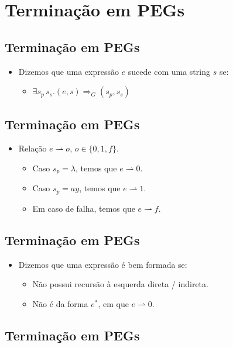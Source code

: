 \documentclass[11pt]{article}
\begin{document}
\section*{Terminação em PEGs}
\label{sec:org8e23bdd}

\subsection*{Terminação em PEGs}
\label{sec:orgc4a3a71}

\begin{itemize}
\item Dizemos que uma expressão \(e\) sucede com uma string \(s\) se:
\begin{itemize}
\item \(\exists s_p\,s_s . (e,s)\Rightarrow_{G} (s_p,s_s)\)
\end{itemize}
\end{itemize}
\subsection*{Terminação em PEGs}
\label{sec:org7a22b09}

\begin{itemize}
\item Relação \(e \rightharpoonup o\), \(o\in\{0,1,f\}\).
\begin{itemize}
\item Caso \(s_p = \lambda\), temos que \(e \rightharpoonup 0\).
\item Caso \(s_p = ay\), temos que \(e \rightharpoonup 1\).
\item Em caso de falha, temos que \(e\rightharpoonup f\).
\end{itemize}
\end{itemize}
\subsection*{Terminação em PEGs}
\label{sec:org396b2d9}

\begin{itemize}
\item Dizemos que uma expressão é bem formada se:
\begin{itemize}
\item Não possui recursão à esquerda direta / indireta.
\item Não é da forma \(e^*\), em que \(e\rightharpoonup 0\).
\end{itemize}
\end{itemize}
\subsection*{Terminação em PEGs}
\label{sec:org30c56a5}
\end{document}
